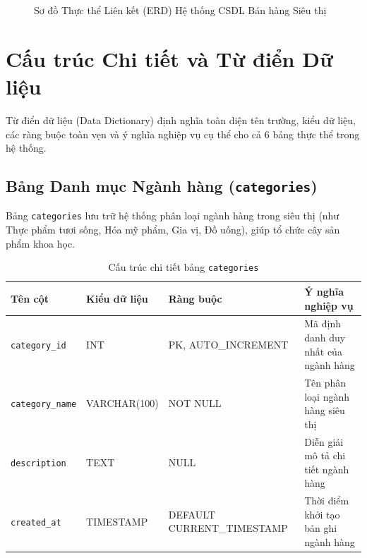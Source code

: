\documentclass[12pt,a4paper]{report}
\begin{document}
\begin{figure}[H]
\caption{Sơ đồ Thực thể Liên kết (ERD) Hệ thống CSDL Bán hàng Siêu thị}
\label{fig:erd_supermarket}
\end{figure}

\section{Cấu trúc Chi tiết và Từ điển Dữ liệu}
Từ điển dữ liệu (Data Dictionary) định nghĩa toàn diện tên trường, kiểu dữ liệu, các ràng buộc toàn vẹn và ý nghĩa nghiệp vụ cụ thể cho cả 6 bảng thực thể trong hệ thống.

\subsection{Bảng Danh mục Ngành hàng (\texttt{categories})}
Bảng \texttt{categories} lưu trữ hệ thống phân loại ngành hàng trong siêu thị (như Thực phẩm tươi sống, Hóa mỹ phẩm, Gia vị, Đồ uống), giúp tổ chức cây sản phẩm khoa học.

\begin{table}[H]
\centering
\footnotesize
\caption{Cấu trúc chi tiết bảng \texttt{categories}}
\label{tab:dict_categories}
\vspace{0.2cm}
\begin{tabularx}{\textwidth}{L{3.3cm} L{2.9cm} L{3.6cm} Y}
\toprule
\textbf{Tên cột} & \textbf{Kiểu dữ liệu} & \textbf{Ràng buộc} & \textbf{Ý nghĩa nghiệp vụ} \\
\midrule
\texttt{category\_id} & INT & PK, AUTO\_INCREMENT & Mã định danh duy nhất của ngành hàng \\
\texttt{category\_name} & VARCHAR(100) & NOT NULL & Tên phân loại ngành hàng siêu thị \\
\texttt{description} & TEXT & NULL & Diễn giải mô tả chi tiết ngành hàng \\
\texttt{created\_at} & TIMESTAMP & DEFAULT CURRENT\_TIMESTAMP & Thời điểm khởi tạo bản ghi ngành hàng \\
\bottomrule
\end{tabularx}
\end{table}
\end{document}
